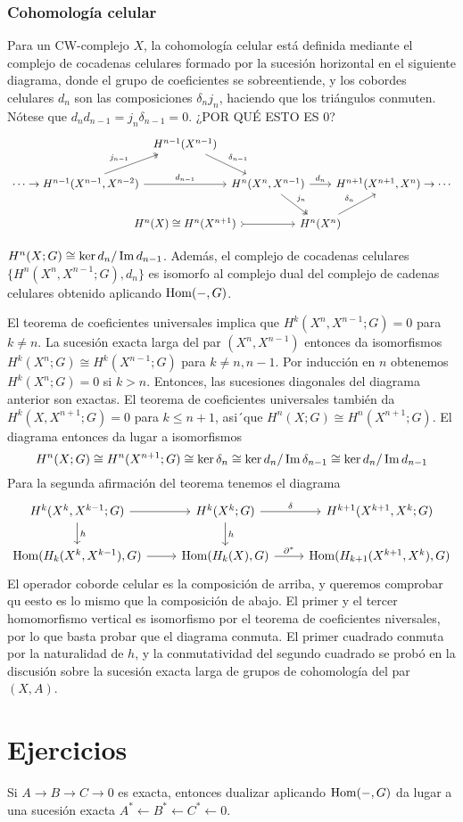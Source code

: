 \documentclass[TA.tex]{subfiles}
\begin{document}
\subsubsection{Cohomología celular}
Para un CW-complejo $X$, la cohomología celular está definida mediante el complejo de cocadenas celulares formado por la sucesión horizontal en el siguiente diagrama, donde el grupo de coeficientes se sobreentiende, y los cobordes celulares $d_n$ son las composiciones $\delta_nj_n$, haciendo que los triángulos conmuten. Nótese que $d_nd_{n-1}=j_n\delta_{n-1}=0$. ¿POR QUÉ ESTO ES 0?
\[
\begin{tikzcd}[column sep=-13]                                                                      & H^{n-1}(X^{n-1})\arrow[dr, "\delta_{n-1}"] & & & \\
\cdots\to H^{n-1}(X^{n-1},X^{n-2})\arrow[rr, "d_{n-1}"]\arrow[ur, twoheadrightarrow, "j_{n-1}"] & & H^n(X^n,X^{n-1})\arrow[dr, twoheadrightarrow, "j_n"]\arrow[rr, "d_n"] & & H^{n+1}(X^{n+1}, X^n)\to\cdots\\
&  H^n(X)\cong H^n(X^{n+1})\arrow[rr, rightarrowtail]& & H^n(X^n)\arrow[ur, "\delta_n"] &
\end{tikzcd}
\]
\begin{teorema}
$H^n(X;G)\cong\ker d_n/\operatorname{Im} d_{n-1}$. Además, el complejo de cocadenas celulares $\{H^n(X^n,X^{n-1};G),d_n\}$ es isomorfo al complejo dual del complejo de cadenas celulares obtenido aplicando $\operatorname{Hom}(-,G)$.
\end{teorema}
\begin{dem}
El teorema de coeficientes universales implica que $H^k(X^n,X^{n-1};G)=0$ para $k\neq n$. La sucesión exacta larga del par $(X^n,X^{n-1})$ entonces da isomorfismos $H^k(X^n;G)\cong H^k(X^{n-1};G)$ para $k\neq n,n-1$. Por inducción en $n$ obtenemos $H^k(X^n;G)=0$ si $k>n$. Entonces, las sucesiones diagonales del diagrama anterior son exactas. El teorema de coeficientes universales también da $H^k(X,X^{n+1};G)=0$ para $k\leq n+1$, asi´que $H^n(X;G)\cong H^n(X^{n+1};G)$. El diagrama entonces da lugar a isomorfismos
\[
H^n(X;G)\cong H^n(X^{n+1};G)\cong\ker\delta_n\cong\ker d_n/\operatorname{Im}\delta_{n-1}\cong\ker d_n/\operatorname{Im} d_{n-1}
\]
Para la segunda afirmación del teorema tenemos el diagrama
\[
\begin{tikzcd}
H^k(X^k,X^{k-1};G)\arrow[r]\arrow[d, "h"] & H^k(X^k;G)\arrow[r, "\delta"]\arrow[d, "h"] & H^{k+1}(X^{k+1},X^k;G)\\
\Hom(H_k(X^k,X^{k-1}),G)\arrow[r] & \Hom(H_k(X),G)\arrow[r, "\partial^*"] & \Hom(H_{k+1}(X^{k+1}, X^k),G)
\end{tikzcd}
\]
El operador coborde celular es la composición de arriba, y queremos comprobar qu eesto es lo mismo que la composición de abajo. El primer y el tercer homomorfismo vertical es isomorfismo por el teorema de coeficientes niversales, por lo que basta probar que el diagrama conmuta. El primer cuadrado conmuta por la naturalidad de $h$, y la conmutatividad del segundo cuadrado se probó en la discusión sobre la sucesión exacta larga de grupos de cohomología del par $(X,A)$. 
\end{dem}


\section{Ejercicios}
\begin{ejer}
Si $A\to B\to C\to 0$ es exacta, entonces dualizar aplicando $\operatorname{Hom}(-,G)$ da lugar a una sucesión exacta $A^*\leftarrow B^*\leftarrow C^*\leftarrow 0$.
\end{ejer}
\end{document}
